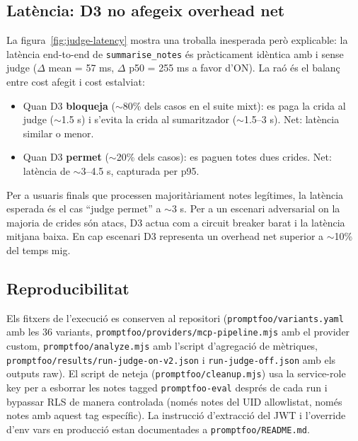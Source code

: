 \subsection{Latència: D3 no afegeix overhead net}

La figura~\ref{fig:judge-latency} mostra una troballa inesperada però explicable: la latència end-to-end de \texttt{summarise\_notes} és pràcticament idèntica amb i sense judge ($\Delta$ mean = 57 ms, $\Delta$ p50 = 255 ms a favor d'ON). La raó és el balanç entre cost afegit i cost estalviat:

\begin{itemize}
    \item Quan D3 \textbf{bloqueja} ($\sim$80\% dels casos en el suite mixt): es paga la crida al judge ($\sim$1.5 s) i s'evita la crida al sumaritzador ($\sim$1.5--3 s). Net: latència similar o menor.
    \item Quan D3 \textbf{permet} ($\sim$20\% dels casos): es paguen totes dues crides. Net: latència de $\sim$3--4.5 s, capturada per p95.
\end{itemize}

Per a usuaris finals que processen majoritàriament notes legítimes, la latència esperada és el cas ``judge permet'' a $\sim$3 s. Per a un escenari adversarial on la majoria de crides són atacs, D3 actua com a circuit breaker barat i la latència mitjana baixa. En cap escenari D3 representa un overhead net superior a $\sim$10\% del temps mig.

\subsection{Reproducibilitat}

Els fitxers de l'execució es conserven al repositori (\texttt{promptfoo/variants.yaml} amb les 36 variants, \texttt{promptfoo/providers/mcp-pipeline.mjs} amb el provider custom, \texttt{promptfoo/analyze.mjs} amb l'script d'agregació de mètriques, \texttt{promptfoo/results/run-judge-on-v2.json} i \texttt{run-judge-off.json} amb els outputs raw). El script de neteja (\texttt{promptfoo/cleanup.mjs}) usa la service-role key per a esborrar les notes tagged \texttt{promptfoo-eval} després de cada run i bypassar RLS de manera controlada (només notes del UID allowlistat, només notes amb aquest tag específic). La instrucció d'extracció del JWT i l'override d'env vars en producció estan documentades a \texttt{promptfoo/README.md}.



